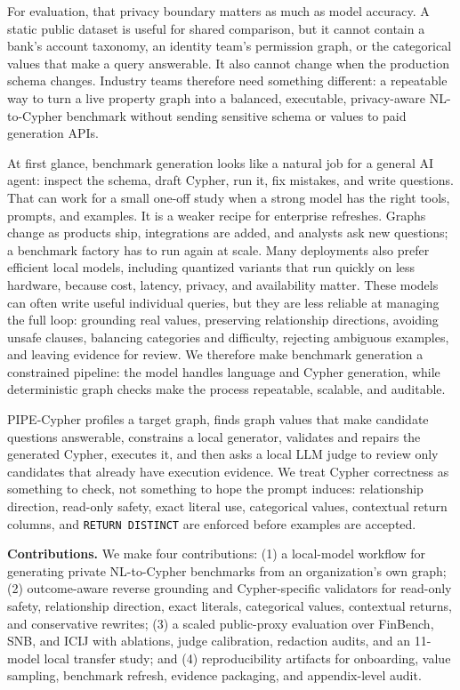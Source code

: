 \documentclass[11pt]{article}
\begin{document}
For evaluation, that privacy boundary matters as much as model accuracy. A static public dataset is useful for shared comparison, but it cannot contain a bank's account taxonomy, an identity team's permission graph, or the categorical values that make a query answerable. It also cannot change when the production schema changes. Industry teams therefore need something different: a repeatable way to turn a live property graph into a balanced, executable, privacy-aware NL-to-Cypher benchmark without sending sensitive schema or values to paid generation APIs.

At first glance, benchmark generation looks like a natural job for a general AI agent: inspect the schema, draft Cypher, run it, fix mistakes, and write questions. That can work for a small one-off study when a strong model has the right tools, prompts, and examples. It is a weaker recipe for enterprise refreshes. Graphs change as products ship, integrations are added, and analysts ask new questions; a benchmark factory has to run again at scale. Many deployments also prefer efficient local models, including quantized variants that run quickly on less hardware, because cost, latency, privacy, and availability matter. These models can often write useful individual queries, but they are less reliable at managing the full loop: grounding real values, preserving relationship directions, avoiding unsafe clauses, balancing categories and difficulty, rejecting ambiguous examples, and leaving evidence for review. We therefore make benchmark generation a constrained pipeline: the model handles language and Cypher generation, while deterministic graph checks make the process repeatable, scalable, and auditable.

PIPE-Cypher profiles a target graph, finds graph values that make candidate questions answerable, constrains a local generator, validates and repairs the generated Cypher, executes it, and then asks a local LLM judge to review only candidates that already have execution evidence. We treat Cypher correctness as something to check, not something to hope the prompt induces: relationship direction, read-only safety, exact literal use, categorical values, contextual return columns, and \texttt{RETURN DISTINCT} are enforced before examples are accepted.

\noindent\textbf{Contributions.} We make four contributions: (1) a local-model workflow for generating private NL-to-Cypher benchmarks from an organization's own graph; (2) outcome-aware reverse grounding and Cypher-specific validators for read-only safety, relationship direction, exact literals, categorical values, contextual returns, and conservative rewrites; (3) a scaled public-proxy evaluation over FinBench, SNB, and ICIJ with ablations, judge calibration, redaction audits, and an 11-model local transfer study; and (4) reproducibility artifacts for onboarding, value sampling, benchmark refresh, evidence packaging, and appendix-level audit.
\end{document}
